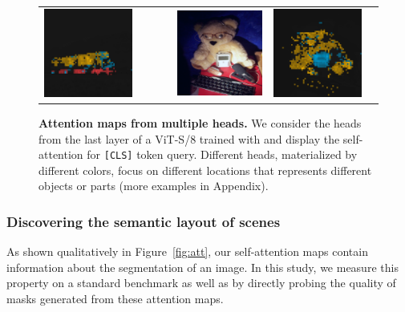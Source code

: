 \begin{figure}[t]
\begin{tabular}{cc ccc cc}
	\includegraphics[width=.24\linewidth]{bnw-1791.png}&&&&
	\includegraphics[width=.24\linewidth]{385.png}&
	\includegraphics[width=.24\linewidth]{bnw-0385.png}
\end{tabular}
\caption{\textbf{Attention maps from multiple heads.}
We consider the heads from the last layer of a ViT-S/8 trained with \OURS and display the self-attention for \texttt{[CLS]} token query.
Different heads, materialized by different colors, focus on different locations that represents different objects or parts
	(more examples in Appendix).}
\label{fig:multihead}
\end{figure}

\subsubsection{Discovering the semantic layout of scenes}

As shown qualitatively in Figure~\ref{fig:att}, our self-attention maps contain information about the segmentation of an image. 
In this study, we measure this property on a standard benchmark as well as by directly probing the quality of masks generated from these attention maps.

